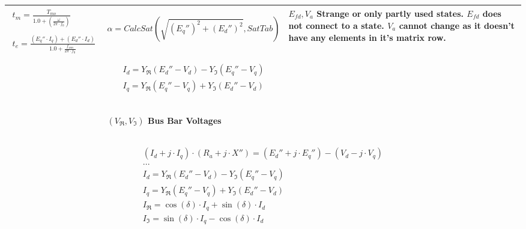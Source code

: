 \documentclass[letterpaper]{article}
\begin{document}
\begin{flushleft}
\tablefirsthead{}
\tablehead{}
\tabletail{}
\tablelasttail{}
\begin{supertabular}{|m{4.794cm}|m{7.896cm}|m{4.2980003cm}|}
\hline
\begin{equation*}
\begin{gathered}t_{m}=\frac{T_{\mathit{mo}}}{1.0+(\frac{\omega }{2\pi
\cdot f_{0}})}\\{}\\t_{e}=\frac{(E_{q}''\cdot {I_{q}})+(E_{d}''\cdot
{I_{d}})}{1.0+\frac{f_{\mathit{wm}}}{2\pi \cdot f_{0}}}\end{gathered}
\end{equation*}
 &
\begin{equation*}
\alpha
=\mathit{CalcSat}(\sqrt{(E_{q}'')^{2}+(E_{d}'')^{2}},\mathit{SatTab})
\end{equation*}
~

\begin{equation*}
\begin{gathered}I_{d}=Y_{\Re }(E_{d}''-V_{d})-Y_{\Im
}(E_{q}''-V_{q})\\I_{q}=Y_{\Re }(E_{q}''-V_{q})+Y_{\Im
}(E_{d}''-V_{d})\end{gathered}
\end{equation*}
~

 $(V_{\Re },V_{\Im })$ Bus Bar Voltages &
 $E_{\mathit{fd}},V_{a}$ Strange or only partly used states. 
$E_{\mathit{fd}}$ does not connect to a state. $V_{a}$ cannot change as
it doesn't have any elements in it's matrix row. \\\hline
\end{supertabular}
\end{flushleft}

\bigskip

\begin{equation*}
\begin{gathered}(I_{d}+j\cdot I_{q})\cdot (R_{a}+j\cdot
X'')=(E_{d}''+j\cdot E_{q}'')-(V_{d}-j\cdot V_{q})\\...\\I_{d}=Y_{\Re
}(E_{d}''-V_{d})-Y_{\Im }(E_{q}''-V_{q})\\I_{q}=Y_{\Re
}(E_{q}''-V_{q})+Y_{\Im }(E_{d}''-V_{d})\\I_{\Re }=\cos (\delta )\cdot
I_{q}+\sin (\delta )\cdot I_{d}\\I_{\Im }=\sin (\delta )\cdot
I_{q}-\cos (\delta )\cdot I_{d}\end{gathered}
\end{equation*}

\bigskip
\end{document}
